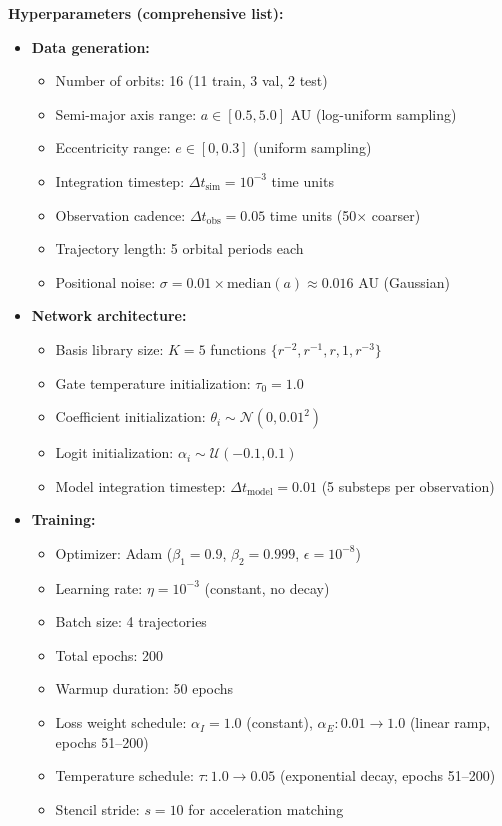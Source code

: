 \documentclass[aps,pre,reprint,superscriptaddress]{revtex4-2}
\begin{document}
\textbf{Hyperparameters (comprehensive list):}
\begin{itemize}
\item \textbf{Data generation:}
  \begin{itemize}
  \item Number of orbits: 16 (11 train, 3 val, 2 test)
  \item Semi-major axis range: $a \in [0.5, 5.0]$ AU (log-uniform sampling)
  \item Eccentricity range: $e \in [0, 0.3]$ (uniform sampling)
  \item Integration timestep: $\Delta t_{\text{sim}} = 10^{-3}$ time units
  \item Observation cadence: $\Delta t_{\text{obs}} = 0.05$ time units (50$\times$ coarser)
  \item Trajectory length: 5 orbital periods each
  \item Positional noise: $\sigma = 0.01 \times \text{median}(a) \approx 0.016$ AU (Gaussian)
  \end{itemize}

\item \textbf{Network architecture:}
  \begin{itemize}
  \item Basis library size: $K = 5$ functions $\{r^{-2}, r^{-1}, r, 1, r^{-3}\}$
  \item Gate temperature initialization: $\tau_0 = 1.0$
  \item Coefficient initialization: $\theta_i \sim \mathcal{N}(0, 0.01^2)$
  \item Logit initialization: $\alpha_i \sim \mathcal{U}(-0.1, 0.1)$
  \item Model integration timestep: $\Delta t_{\text{model}} = 0.01$ (5 substeps per observation)
  \end{itemize}

\item \textbf{Training:}
  \begin{itemize}
  \item Optimizer: Adam ($\beta_1 = 0.9$, $\beta_2 = 0.999$, $\epsilon = 10^{-8}$)
  \item Learning rate: $\eta = 10^{-3}$ (constant, no decay)
  \item Batch size: 4 trajectories
  \item Total epochs: 200
  \item Warmup duration: 50 epochs
  \item Loss weight schedule: $\alpha_I = 1.0$ (constant), $\alpha_E: 0.01 \to 1.0$ (linear ramp, epochs 51--200)
  \item Temperature schedule: $\tau: 1.0 \to 0.05$ (exponential decay, epochs 51--200)
  \item Stencil stride: $s = 10$ for acceleration matching
  \end{itemize}


\end{itemize}
\end{document}
